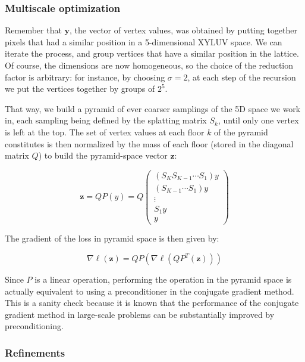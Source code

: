 \documentclass{article}
\begin{document}
\subsubsection{Multiscale optimization}

Remember that $\textbf{y}$, the vector of vertex values, was obtained by putting together pixels that had a similar position in a 5-dimensional XYLUV space. We can iterate the process, and group vertices that have a similar position in the lattice.
Of course, the dimensions are now homogeneous, so the choice of the reduction factor is arbitrary: for instance, by choosing $\sigma = 2$, at each step of the recursion we put the vertices together by groups of $2^5$.

That way, we build a pyramid of ever coarser samplings of the 5D space we work in, each sampling being defined by the splatting matrix $S_k$, until only one vertex is left at the top. The set of vertex values at each floor $k$ of the pyramid constitutes is then normalized by the mass of each floor (stored in the diagonal matrix $Q$) to build the pyramid-space vector $\textbf{z}$:

\begin{equation}
    \textbf{z} = QP(y) = Q\begin{pmatrix}
    (S_K S_{K-1} \cdots S_1) y \\
    (S_{K-1} \cdots S_1) y \\
    \vdots \\
    S_1 y \\
    y
    \end{pmatrix}
\end{equation}

The gradient of the loss in pyramid space is then given by:

\begin{equation}
    \nabla \ell(\textbf{z}) = QP (\nabla \ell (Q P^T (\textbf{z})))
\end{equation}

Since $P$ is a linear operation, performing the operation in the pyramid space is actually equivalent to using a preconditioner in the conjugate gradient method.
This is a sanity check because it is known that the performance of the conjugate gradient method in large-scale problems can be substantially improved by preconditioning.

\subsubsection{Refinements}
\end{document}
